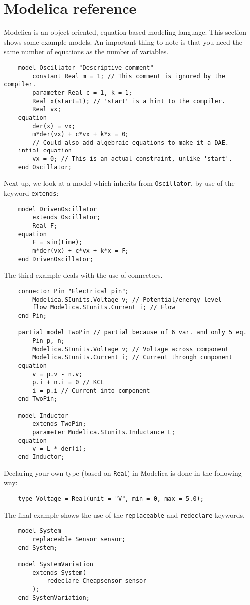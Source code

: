 \part{Modelica reference}
Modelica is an object-oriented, equation-based modeling language. This section shows some example models. An important thing to note is that you need the same number of equations as the number of variables.
\begin{verbatim}
    model Oscillator "Descriptive comment"
        constant Real m = 1; // This comment is ignored by the compiler.
        parameter Real c = 1, k = 1;
        Real x(start=1); // 'start' is a hint to the compiler.
        Real vx;
    equation
        der(x) = vx;
        m*der(vx) + c*vx + k*x = 0;
        // Could also add algebraic equations to make it a DAE.
    intial equation
        vx = 0; // This is an actual constraint, unlike 'start'.
    end Oscillator;
\end{verbatim}
Next up, we look at a model which inherits from \texttt{Oscillator}, by use of the keyword \texttt{extends}:
\begin{verbatim}
    model DrivenOscillator
        extends Oscillator;
        Real F;
    equation
        F = sin(time);
        m*der(vx) + c*vx + k*x = F;
    end DrivenOscillator;
\end{verbatim}
\newpage
The third example deals with the use of connectors.
\begin{verbatim}
    connector Pin "Electrical pin";
        Modelica.SIunits.Voltage v; // Potential/energy level
        flow Modelica.SIunits.Current i; // Flow
    end Pin;

    partial model TwoPin // partial because of 6 var. and only 5 eq.
        Pin p, n;
        Modelica.SIunits.Voltage v; // Voltage across component
        Modelica.SIunits.Current i; // Current through component
    equation
        v = p.v - n.v;
        p.i + n.i = 0 // KCL
        i = p.i // Current into component
    end TwoPin;

    model Inductor
        extends TwoPin;
        parameter Modelica.SIunits.Inductance L;
    equation
        v = L * der(i);
    end Inductor;
\end{verbatim}
Declaring your own type (based on \texttt{Real}) in Modelica is done in the following way:
\begin{verbatim}
    type Voltage = Real(unit = "V", min = 0, max = 5.0);
\end{verbatim}
The final example shows the use of the \texttt{replaceable} and \texttt{redeclare} keywords.
\begin{verbatim}
    model System
        replaceable Sensor sensor;
    end System;

    model SystemVariation
        extends System(
            redeclare Cheapsensor sensor
        );
    end SystemVariation;
\end{verbatim}